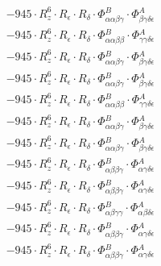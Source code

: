 \documentclass{article}
\begin{document}
\begin{subequations}
\begin{gather}
\begin{array}{c}
 \\[0.2em] 		 - 945 \cdot R_{z}^{6} \cdot R_{\epsilon{}} \cdot R_{\delta{}} \cdot \Phi{}^{B}_{\alpha{}\alpha{}\beta{}\gamma{}} \cdot \Phi{}^{A}_{\beta{}\gamma{}\delta{}\epsilon{}} 
 \\[0.2em] 		 - 945 \cdot R_{z}^{6} \cdot R_{\epsilon{}} \cdot R_{\delta{}} \cdot \Phi{}^{B}_{\alpha{}\alpha{}\beta{}\beta{}} \cdot \Phi{}^{A}_{\gamma{}\gamma{}\delta{}\epsilon{}} 
 \\[0.2em] 		 - 945 \cdot R_{z}^{6} \cdot R_{\epsilon{}} \cdot R_{\delta{}} \cdot \Phi{}^{B}_{\alpha{}\alpha{}\beta{}\gamma{}} \cdot \Phi{}^{A}_{\beta{}\gamma{}\delta{}\epsilon{}} 
 \\[0.2em] 		 - 945 \cdot R_{z}^{6} \cdot R_{\epsilon{}} \cdot R_{\delta{}} \cdot \Phi{}^{B}_{\alpha{}\alpha{}\beta{}\gamma{}} \cdot \Phi{}^{A}_{\beta{}\gamma{}\delta{}\epsilon{}} 
 \\[0.2em] 		 - 945 \cdot R_{z}^{6} \cdot R_{\epsilon{}} \cdot R_{\delta{}} \cdot \Phi{}^{B}_{\alpha{}\alpha{}\beta{}\beta{}} \cdot \Phi{}^{A}_{\gamma{}\gamma{}\delta{}\epsilon{}} 
 \\[0.2em] 		 - 945 \cdot R_{z}^{6} \cdot R_{\epsilon{}} \cdot R_{\delta{}} \cdot \Phi{}^{B}_{\alpha{}\alpha{}\beta{}\gamma{}} \cdot \Phi{}^{A}_{\beta{}\gamma{}\delta{}\epsilon{}} 
 \\[0.2em] 		 - 945 \cdot R_{z}^{6} \cdot R_{\epsilon{}} \cdot R_{\delta{}} \cdot \Phi{}^{B}_{\alpha{}\alpha{}\beta{}\gamma{}} \cdot \Phi{}^{A}_{\beta{}\gamma{}\delta{}\epsilon{}} 
 \\[0.2em] 		 - 945 \cdot R_{z}^{6} \cdot R_{\epsilon{}} \cdot R_{\delta{}} \cdot \Phi{}^{B}_{\alpha{}\beta{}\beta{}\gamma{}} \cdot \Phi{}^{A}_{\alpha{}\gamma{}\delta{}\epsilon{}} 
 \\[0.2em] 		 - 945 \cdot R_{z}^{6} \cdot R_{\epsilon{}} \cdot R_{\delta{}} \cdot \Phi{}^{B}_{\alpha{}\beta{}\beta{}\gamma{}} \cdot \Phi{}^{A}_{\alpha{}\gamma{}\delta{}\epsilon{}} 
 \\[0.2em] 		 - 945 \cdot R_{z}^{6} \cdot R_{\epsilon{}} \cdot R_{\delta{}} \cdot \Phi{}^{B}_{\alpha{}\beta{}\gamma{}\gamma{}} \cdot \Phi{}^{A}_{\alpha{}\beta{}\delta{}\epsilon{}} 
 \\[0.2em] 		 - 945 \cdot R_{z}^{6} \cdot R_{\epsilon{}} \cdot R_{\delta{}} \cdot \Phi{}^{B}_{\alpha{}\beta{}\beta{}\gamma{}} \cdot \Phi{}^{A}_{\alpha{}\gamma{}\delta{}\epsilon{}} 
 \\[0.2em] 		 - 945 \cdot R_{z}^{6} \cdot R_{\epsilon{}} \cdot R_{\delta{}} \cdot \Phi{}^{B}_{\alpha{}\beta{}\beta{}\gamma{}} \cdot \Phi{}^{A}_{\alpha{}\gamma{}\delta{}\epsilon{}} 

\end{array}
\end{gather}
\end{subequations}
\end{document}
